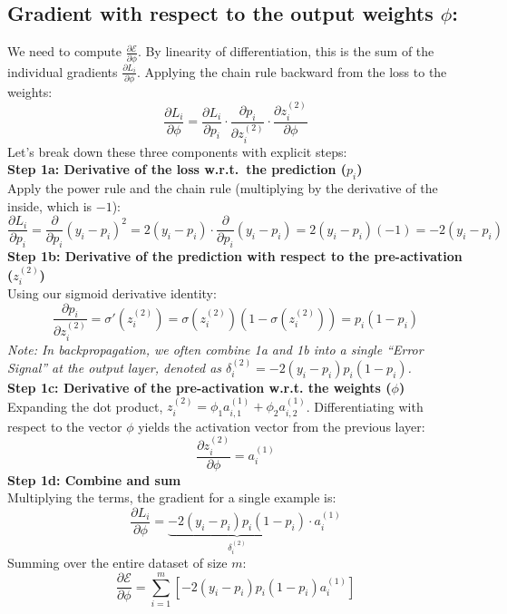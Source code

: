 \documentclass[twoside, 10pt]{article}
\begin{document}
\subsection{Gradient with respect to the output weights \texorpdfstring{$\phi$}{phi}:}
We need to compute $\frac{\partial \mathcal{E}}{\partial \phi}$. By linearity of differentiation, this is the sum of the individual gradients $\frac{\partial L_i}{\partial \phi}$.
Applying the chain rule backward from the loss to the weights:
\begin{equation}
    \frac{\partial L_i}{\partial \phi} = \frac{\partial L_i}{\partial p_i} \cdot \frac{\partial p_i}{\partial z_i^{(2)}} \cdot \frac{\partial z_i^{(2)}}{\partial \phi}
\end{equation}
Let's break down these three components with explicit steps:\\
\textbf{Step 1a: Derivative of the loss w.r.t.\ the prediction ($p_i$)} \\
Apply the power rule and the chain rule (multiplying by the derivative of the inside, which is $-1$):
\[ \frac{\partial L_i}{\partial p_i} = \frac{\partial}{\partial p_i} (y_i - p_i)^2 = 2(y_i - p_i) \cdot \frac{\partial}{\partial p_i} (y_i - p_i) = 2(y_i - p_i)(-1) = -2(y_i - p_i) \]
\textbf{Step 1b: Derivative of the prediction with respect to the pre-activation ($z_i^{(2)}$)} \\
Using our sigmoid derivative identity:
\[ \frac{\partial p_i}{\partial z_i^{(2)}} = \sigma'(z_i^{(2)}) = \sigma(z_i^{(2)})(1 - \sigma(z_i^{(2)})) = p_i(1 - p_i) \]
\textit{Note: In backpropagation, we often combine 1a and 1b into a single ``Error Signal'' at the output layer, denoted as $\delta_i^{(2)} = -2(y_i - p_i)p_i(1 - p_i)$.}\\
\textbf{Step 1c: Derivative of the pre-activation w.r.t. the weights ($\phi$)} \\
Expanding the dot product, $z_i^{(2)} = \phi_1 a_{i,1}^{(1)} + \phi_2 a_{i,2}^{(1)}$. Differentiating with respect to the vector $\phi$ yields the activation vector from the previous layer:
\[ \frac{\partial z_i^{(2)}}{\partial \phi} = a_i^{(1)} \]
\textbf{Step 1d: Combine and sum} \\
Multiplying the terms, the gradient for a single example is:
\[ \frac{\partial L_i}{\partial \phi} = \underbrace{-2(y_i - p_i) p_i(1 - p_i)}_{\delta_i^{(2)}} \cdot a_i^{(1)} \]
Summing over the entire dataset of size $m$:
\begin{equation}
    \frac{\partial \mathcal{E}}{\partial \phi} = \sum_{i=1}^m \left[ -2(y_i - p_i) p_i(1 - p_i) a_i^{(1)} \right]
\end{equation}
\end{document}
